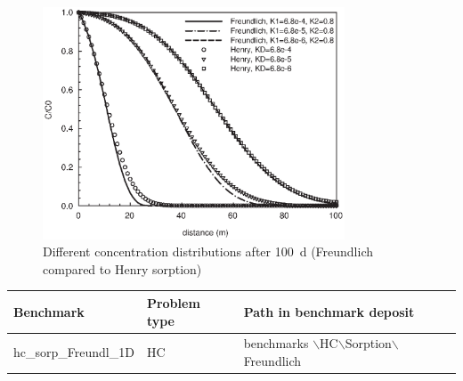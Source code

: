 \begin{figure}[htbp]
\centering
\includegraphics[width=0.8\textwidth]{C/figures/fig55.EPS}
\caption{Different concentration distributions after 100~d (Freundlich compared to Henry sorption)}
\label{fig55}
\end{figure}

\begin{tabular}{|l|l|l|}
\hline
Benchmark & Problem type	& Path in benchmark deposit \\
\hline	
hc\_sorp\_Freundl\_1D	& HC	& benchmarks $\backslash$HC$\backslash$Sorption$\backslash$Freundlich \\
\hline	
\end{tabular}

